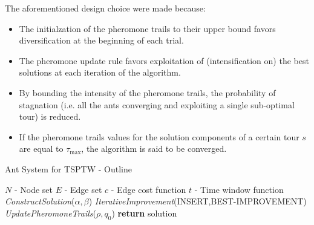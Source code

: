 \begin{homeworkProblem}
The aforementioned design choice were made because:

\begin{itemize}
    \item The initialzation of the pheromone trails to their upper bound favors diversification at the beginning of each trial.
    \item The pheromone update rule favors exploitation of (intensification on) the best solutions at each iteration of the algorithm.
    \item By bounding the intensity of the pheromone trails, the probability of stagnation (i.e. all the ants converging and exploiting a single sub-optimal tour) is reduced.
    \item If the pheromone trails values for the solution components of a certain tour $s$ are equal to $\tau_{\max}$, the algorithm is said to be converged.
  \end{itemize}
  

\begin{algorithm}[!h]
  \caption{\maxmin Ant System for TSPTW - Outline}\label{maxmintsptw}
  \begin{algorithmic}[1]
    \Require $N$ - Node set
    \Require $E$ - Edge set 
    \Require $c$ - Edge cost function
    \Require $t$ - Time window function
        \State \emph{ConstructSolution}($\alpha,\beta$)
        \State \emph{IterativeImprovement}(INSERT,BEST-IMPROVEMENT)
        \State \emph{UpdatePheromoneTrails}($\rho,q_0$)
      \EndFor
    \EndWhile
    \State \textbf{return} solution
    \State
  \EndProcedure
\end{algorithmic}
\end{algorithm}

\begin{center}
  
\begin{minipage}{.45\textwidth}
\centering
{}
\end{minipage}
\end{center}
\end{homeworkProblem}
